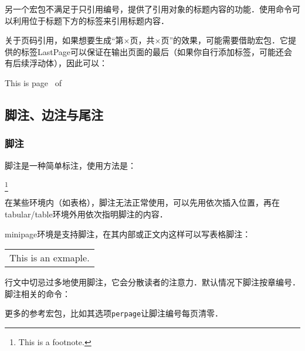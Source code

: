另一个宏包不满足于只引用编号，提供了引用对象的标题内容的功能．使用命令可以利用位于标题下方的标签来引用标题内容．

关于页码引用，如果想要生成“第$\times$页，共$\times$页”的效果，可能需要借助宏包．它提供的标签LastPage可以保证在输出页面的最后（如果你自行添加标签，可能还会有后续浮动体），因此可以：

\begin{codeshow}
This is page \thepage\ of \pageref{LastPage}
\end{codeshow}

\subsection{脚注、边注与尾注}
\subsubsection{脚注}
脚注是一种简单标注，使用方法是：
\begin{latex}
\footnote{This is a footnote.}
\end{latex}

在某些环境内（如表格），脚注无法正常使用，可以先用依次插入位置，再在tabular/table环境外用依次指明脚注的内容．

minipage环境是支持脚注，在其内部或正文内这样可以写表格脚注：

\begin{codeshow}
\begin{minipage}{\linewidth}
\begin{tabular}{l}
This is an exmaple\footnotemark. 
\end{tabular}
\end{minipage}
\end{codeshow}

行文中切忌过多地使用脚注，它会分散读者的注意力．默认情况下脚注按章编号．脚注相关的命令：
\begin{latex}
\caption{Titel\protect\footnote{This is footnote.}}
\renewcommand\footnoterule{\rule{0.4\columnwidth}{0.4pt}}
\setlength{\skip\footins}{0.5cm}
\end{latex}

更多的参考宏包，比如其选项\texttt{perpage}让脚注编号每页清零．

